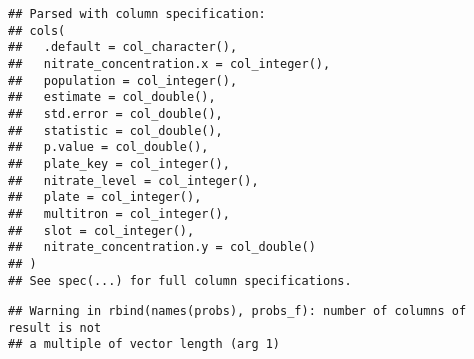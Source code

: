 \documentclass[]{article}
\newenvironment{Shaded}{\begin{snugshade}}{\end{snugshade}}
\newcommand{\KeywordTok}[1]{\textcolor[rgb]{0.13,0.29,0.53}{\textbf{{#1}}}}
\newcommand{\DataTypeTok}[1]{\textcolor[rgb]{0.13,0.29,0.53}{{#1}}}
\newcommand{\StringTok}[1]{\textcolor[rgb]{0.31,0.60,0.02}{{#1}}}
\newcommand{\NormalTok}[1]{{#1}}
\begin{document}
\begin{Shaded}
\end{Shaded}

\begin{verbatim}
## Parsed with column specification:
## cols(
##   .default = col_character(),
##   nitrate_concentration.x = col_integer(),
##   population = col_integer(),
##   estimate = col_double(),
##   std.error = col_double(),
##   statistic = col_double(),
##   p.value = col_double(),
##   plate_key = col_integer(),
##   nitrate_level = col_integer(),
##   plate = col_integer(),
##   multitron = col_integer(),
##   slot = col_integer(),
##   nitrate_concentration.y = col_double()
## )
## See spec(...) for full column specifications.
\end{verbatim}

\begin{verbatim}
## Warning in rbind(names(probs), probs_f): number of columns of result is not
## a multiple of vector length (arg 1)
\end{verbatim}
\end{document}
